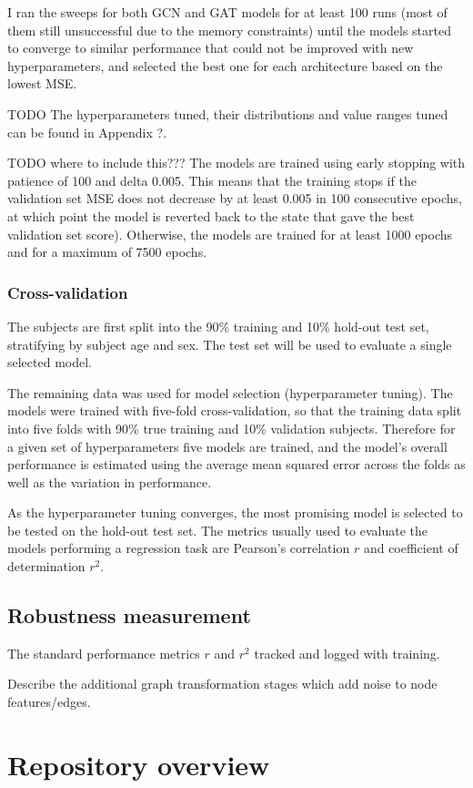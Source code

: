I ran the sweeps for both GCN and GAT models for at least 100 runs (most of them still unsuccessful due to the memory constraints) until the models started to converge to similar performance that could not be improved with new hyperparameters, and selected the best one for each architecture based on the lowest MSE.

TODO The hyperparameters tuned, their distributions and value ranges tuned can be found in Appendix ?.

TODO where to include this??? The models are trained using early stopping with patience of 100 and delta 0.005. This means that the training stops if the validation set MSE does not decrease by at least 0.005 in 100 consecutive epochs, at which point the model is reverted back to the state that gave the best validation set score). Otherwise, the models are trained for at least 1000 epochs and for a maximum of 7500 epochs.

\subsubsection{Cross-validation}
The subjects are first split into the 90\% training and 10\% hold-out test set, stratifying by subject age and sex. The test set will be used to evaluate a single selected model. 

The remaining data was used for model selection (hyperparameter tuning). The models were trained with five-fold cross-validation, so that the training data split into five folds with 90\% true training and 10\% validation subjects. Therefore for a given set of hyperparameters five models are trained, and the model's overall performance is estimated using the average mean squared error across the folds as well as the variation in performance. 

As the hyperparameter tuning converges, the most promising model is selected to be tested on the hold-out test set. The metrics usually used to evaluate the models performing a regression task are Pearson's correlation $r$ and coefficient of determination $r^2$.

\subsection{Robustness measurement}


The standard performance metrics $r$ and $r^2$ tracked and logged with training.

Describe the additional graph transformation stages which add noise to node features/edges.


\section{Repository overview}

